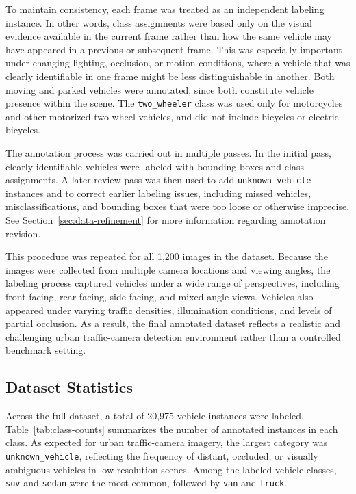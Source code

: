 To maintain consistency, each frame was treated as an independent labeling instance.
In other words, class assignments were based only on the visual evidence available in
the current frame rather than how the same vehicle may have appeared in a previous
or subsequent frame. This was especially important under changing lighting,
occlusion, or motion conditions, where a vehicle that was clearly identifiable in one
frame might be less distinguishable in another. Both moving and parked vehicles were
annotated, since both constitute vehicle presence within the scene. The
\verb|two_wheeler| class was used only for motorcycles and other motorized two-wheel
vehicles, and did not include bicycles or electric bicycles.

The annotation process was carried out in multiple passes. In the initial pass,
clearly identifiable vehicles were labeled with bounding boxes and class assignments.
A later review pass was then used to add \verb|unknown_vehicle| instances and to
correct earlier labeling issues, including missed vehicles, misclassifications, and
bounding boxes that were too loose or otherwise imprecise.
See Section~\ref{sec:data-refinement} for more information regarding annotation revision.

This procedure was repeated for all 1,200 images in the dataset.
Because the images were collected from multiple camera locations and viewing angles,
the labeling process captured vehicles under a wide range of perspectives, including
front-facing, rear-facing, side-facing, and mixed-angle views. Vehicles also appeared
under varying traffic densities, illumination conditions, and levels of partial
occlusion. As a result, the final annotated dataset reflects a realistic and
challenging urban traffic-camera detection environment rather than a controlled
benchmark setting.

\newpage
\subsection{Dataset Statistics}

Across the full dataset, a total of 20,975 vehicle instances were labeled. 
Table~\ref{tab:class-counts} summarizes the number of annotated instances in each
class. As expected for urban traffic-camera imagery, the largest category was 
\verb|unknown_vehicle|, reflecting the frequency of distant, occluded, or visually
ambiguous vehicles in low-resolution scenes. Among the labeled vehicle classes, 
\verb|suv| and \verb|sedan| were the most common, followed by \verb|van| and 
\verb|truck|.


